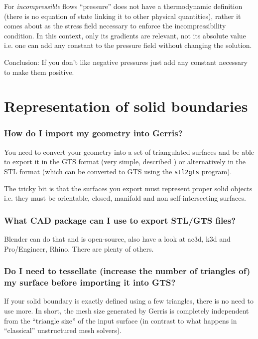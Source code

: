 \documentclass[a4paper]{article}
\begin{document}
For {\em incompressible} flows ``pressure'' does not have a thermodynamic
definition (there is no equation of state linking it to other physical
quantities), rather it comes about as the stress field necessary to
enforce the incompressibility condition. In this context, only its
gradients are relevant, not its absolute value i.e. one can add any
constant to the pressure field without changing the solution.

Conclusion: If you don't like negative pressures just add any constant
necessary to make them positive.

\section{Representation of solid boundaries}

\subsubsection{How do I import my geometry into Gerris?}

You need to convert your geometry into a set of triangulated surfaces
and be able to export it in the GTS format (very simple, described
)
or alternatively in the STL format (which can be converted to GTS
using the {\tt stl2gts} program).

The tricky bit is that the surfaces you export must represent proper
solid objects i.e. they must be orientable, closed, manifold and non
self-intersecting surfaces.

\subsubsection{What CAD package can I use to export STL/GTS files?}

Blender can do that and is open-source, also have a look at ac3d, k3d
and Pro/Engineer, Rhino. There are plenty of others.

\subsubsection{Do I need to tessellate (increase the number of triangles of) 
my surface before importing it into GTS?}

If your solid boundary is exactly defined using a few triangles, there
is no need to use more. In short, the mesh size generated by Gerris is
completely independent from the ``triangle size'' of the input surface
(in contrast to what happens in ``classical'' unstructured mesh
solvers).
\end{document}
